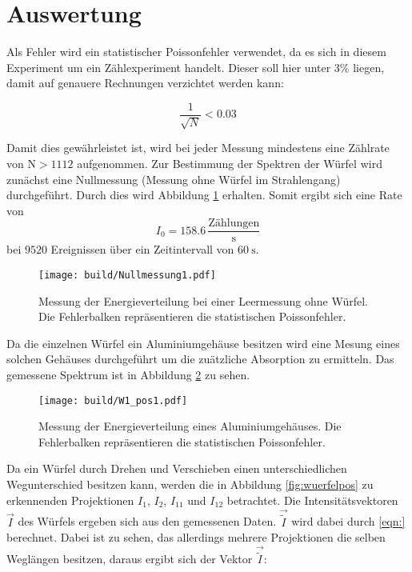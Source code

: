 \newpage
\section{Auswertung}

\label{sec:Auswertung}

Als Fehler wird ein statistischer Poissonfehler verwendet, da es sich in diesem
Experiment um ein Zählexperiment handelt. Dieser soll hier unter 3\% liegen,
damit auf genauere Rechnungen verzichtet werden kann:

\begin{equation*}
  \frac{1}{\sqrt{N}} < 0.03
\end{equation*}

Damit dies gewährleistet ist, wird bei jeder Messung mindestens eine
Zählrate von $\text{N}>1112$ aufgenommen.
Zur Bestimmung der Spektren der Würfel wird zunächst eine Nullmessung (Messung
ohne Würfel im Strahlengang) durchgeführt. Durch dies wird Abbildung \ref{fig:leer}
erhalten. Somit ergibt sich eine Rate von
\begin{equation*}
    I_0 = 158.6 \,\frac{\text{Zählungen}}{\text{s}}
\end{equation*}
bei $9520$ Ereignissen über ein Zeitintervall von $\SI{60}{\second}$.

\begin{figure}[htb]
  \centering
  \texttt{[image: build/Nullmessung1.pdf]}
  \caption{Messung der Energieverteilung bei einer Leermessung ohne Würfel. Die
  Fehlerbalken repräsentieren die statistischen Poissonfehler.}
  \label{fig:leer}
\end{figure}

Da die einzelnen Würfel ein Aluminiumgehäuse besitzen wird eine Mesung eines solchen
Gehäuses durchgeführt um die zuätzliche Absorption zu ermitteln. Das gemessene Spektrum ist in
Abbildung \ref{fig:alu} zu sehen.

\begin{figure}[htb]
  \centering
  \texttt{[image: build/W1\_pos1.pdf]}
  \caption{Messung der Energieverteilung eines Aluminiumgehäuses. Die Fehlerbalken
  repräsentieren die statistischen Poissonfehler.}
  \label{fig:alu}
\end{figure}

Da ein Würfel durch Drehen und Verschieben einen unterschiedlichen Wegunterschied
besitzen kann, werden die in Abbildung \ref{fig:wuerfelpos} zu erkennenden Projektionen
$I_1$, $I_2$, $I_11$ und $I_12$ betrachtet. Die Intensitätsvektoren $\vec{I}$ des Würfels ergeben sich aus
den gemessenen Daten. $\vec{\tilde{I}}$ wird dabei durch \ref{eqn:} berechnet. Dabei ist zu sehen, das allerdings mehrere Projektionen die selben Weglängen
besitzen, daraus ergibt sich der Vektor $\vec{\tilde{I}}$:

